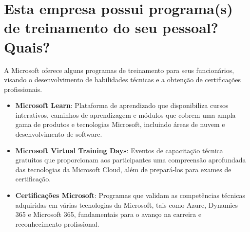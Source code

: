 \section{Esta empresa possui programa(s) de treinamento do seu pessoal? Quais?}

A Microsoft oferece alguns programas de treinamento para seus funcionários, visando o desenvolvimento de habilidades técnicas e a obtenção de certificações profissionais.

\begin{itemize}
    \item \textbf{Microsoft Learn}: Plataforma de aprendizado que disponibiliza cursos interativos, caminhos de aprendizagem e módulos que cobrem uma ampla gama de produtos e tecnologias Microsoft, incluindo áreas de nuvem e desenvolvimento de software.
    \item \textbf{Microsoft Virtual Training Days}: Eventos de capacitação técnica gratuitos que proporcionam aos participantes uma compreensão aprofundada das tecnologias da Microsoft Cloud, além de prepará-los para exames de certificação.
    \item \textbf{Certificações Microsoft}: Programas que validam as competências técnicas adquiridas em várias tecnologias da Microsoft, tais como Azure, Dynamics 365 e Microsoft 365, fundamentais para o avanço na carreira e reconhecimento profissional.
\end{itemize}
